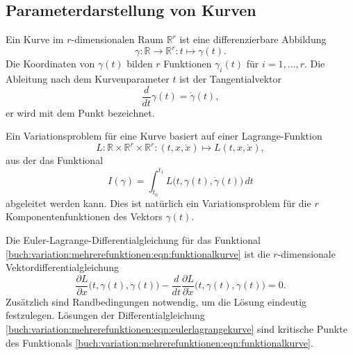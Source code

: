 %
%
\subsection{Parameterdarstellung von Kurven
\label{buch:variation:mehrerefunktionen:subsection:kurven}}
Ein Kurve im $r$-dimensionalen Raum $\mathbb{R}^r$ ist eine differenzierbare
Abbildung
\[
\gamma
\colon
\mathbb{R} \to \mathbb{R}^r
:
t \mapsto \gamma(t).
\]
Die Koordinaten von $\gamma(t)$ bilden $r$ Funktionen $\gamma_i(t)$
für $i=1,\dots,r$.
Die Ableitung nach dem Kurvenparameter $t$ ist der Tangentialvektor
\[
\frac{d}{dt}\gamma(t) = \dot{\gamma}(t),
\]
er wird mit dem Punkt bezeichnet.

Ein Variationsproblem für eine Kurve basiert auf einer Lagrange-Funktion
\[
L
\colon
\mathbb{R}\times\mathbb{R}^r\times\mathbb{R}^r
:
(t,x,\dot{x})
\mapsto
L(t,x,\dot{x}),
\]
aus der das Funktional
\begin{equation}
I(\gamma)
=
\int_{t_0}^{t_1}
L\bigl(t,\gamma(t),\dot{\gamma}(t)\bigr)
\,dt
\label{buch:variation:mehrerefunktionen:eqn:funktionalkurve}
\end{equation}
abgeleitet werden kann.
Dies ist natürlich ein Variationsproblem für die $r$ Komponentenfunktionen
des Vektors $\gamma(t)$.

Die Euler-Lagrange-Differentialgleichung für das Funktional
\eqref{buch:variation:mehrerefunktionen:eqn:funktionalkurve}
ist die $r$-di\-men\-sio\-na\-le Vektordifferentialgleichung
\begin{equation}
\frac{\partial L}{\partial x}\bigl(t,\gamma(t), \dot{\gamma}(t)\bigr)
-
\frac{d}{dt}
\frac{\partial L}{\partial \dot{x}}\bigl(t,\gamma(t),\dot{\gamma}(t)\bigr)
=
0.
\label{buch:variation:mehrerefunktionen:eqn:eulerlagrangekurve}
\end{equation}
Zusätzlich sind Randbedingungen notwendig, um die Lösung 
eindeutig festzulegen.
Lösungen der Differentialgleichung
\eqref{buch:variation:mehrerefunktionen:eqn:eulerlagrangekurve}
sind kritische Punkte des Funktionals
\eqref{buch:variation:mehrerefunktionen:eqn:funktionalkurve}.

%
%






